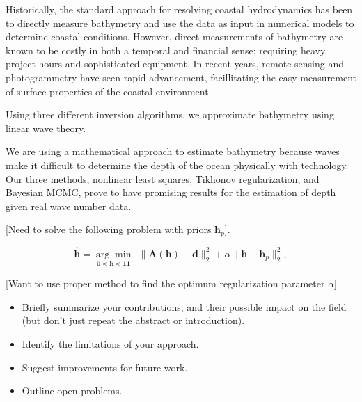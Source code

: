 Historically, the standard approach for resolving coastal hydrodynamics has been to directly measure bathymetry and use the data as input in numerical models to determine coastal conditions. However, direct measurements of bathymetry are known to be costly in both a temporal and financial sense; requiring heavy project hours and sophisticated equipment. In recent years, remote sensing and photogrammetry have seen rapid advancement, facillitating the easy measurement of surface properties of the coastal environment.

Using three different inversion algorithms, we approximate bathymetry using linear wave theory.

 We are using a mathematical approach to estimate bathymetry because waves make it difficult to determine the depth of the ocean physically with technology. Our three methods, nonlinear least squares, Tikhonov regularization, and Bayesian MCMC, prove to have promising results for the estimation of depth given real wave number data. 


[Need to solve the following problem with priors $\mathbf{h}_p$].

\begin{equation}\label{LS-regBC}
\mathbf{\hat{h}} = \underset{\mathbf{0} \preceq \mathbf{h} \preceq \mathbf{11}}{\arg \min} \ \ \|  \mathbf{A}(\mathbf{h}) -  \mathbf{d} \|_2^2  +  \alpha \| \mathbf{h} -  \mathbf{h}_p\|_2^2,
\end{equation}

[Want to use proper method to find the optimum regularization parameter $\alpha$]

\begin{itemize}
\item Briefly summarize your contributions, and their possible
impact on the field (but don't just repeat the abstract or introduction).
\item Identify the limitations of your approach.
\item Suggest improvements for future work.
\item Outline open problems.
\end{itemize}

